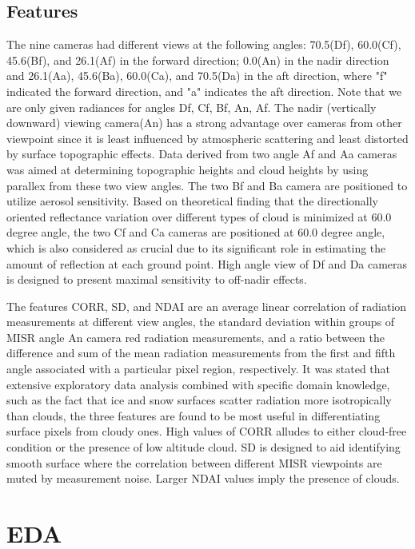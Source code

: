 \documentclass{article}\usepackage[]{graphicx}\usepackage[]{color}
\begin{document}
\subsection{Features} The nine cameras had different views at the following angles: 70.5\textdegree (Df), 60.0\textdegree (Cf), 45.6\textdegree (Bf), and 26.1\textdegree (Af) in the forward direction; 0.0\textdegree (An) in the nadir direction and 26.1\textdegree (Aa), 45.6\textdegree (Ba), 60.0\textdegree (Ca), and 70.5\textdegree (Da) in the aft direction, where "f" indicated the forward
direction, and "a" indicates the aft direction. Note that we are only given radiances for angles Df, Cf, Bf, An, Af. The nadir (vertically downward) viewing camera(An) has a strong advantage over cameras from other viewpoint since it is least influenced by atmospheric scattering and least distorted by surface topographic effects. Data derived from two angle Af and Aa cameras was aimed at determining topographic heights and cloud heights by using parallex from these two view angles. The two Bf and Ba camera are positioned to utilize aerosol sensitivity. Based on theoretical finding that the directionally oriented reflectance variation over different types of cloud is minimized at 60.0 degree angle, the two Cf and Ca cameras are positioned at 60.0 degree angle, which is also considered as crucial due to its significant role in estimating the amount of reflection at each ground point. High angle view of Df and Da cameras is designed to present maximal sensitivity to off-nadir effects. 


The features CORR, SD, and NDAI are an average linear correlation of radiation measurements at different view angles, the standard deviation within groups of MISR angle An camera red radiation measurements, and a ratio between the difference and sum of the mean radiation measurements from the first and fifth angle associated with a particular pixel region, respectively. It was stated that extensive exploratory data analysis combined with specific domain knowledge, such as the fact that ice and snow surfaces scatter radiation more isotropically than clouds, the three features are found to be most useful in differentiating surface pixels from cloudy ones. High values of CORR alludes to either cloud-free condition or the presence of low altitude cloud. SD is designed to aid identifying smooth surface where the correlation between different MISR viewpoints are muted by measurement noise. Larger NDAI values imply the presence of clouds.

\section{EDA}
\end{document}
